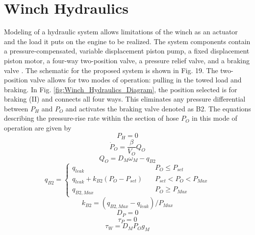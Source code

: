 \section{Winch Hydraulics}

Modeling of a hydraulic system allows limitations of the winch as an actuator and the load it puts on the engine to be realized. The system components contain a pressure-compensated, variable displacement piston pump, a fixed displacement piston motor, a four-way two-position valve, a pressure relief valve, and a braking valve \cite{MathWorks2015bb,MathWorks2015a,MathWorks2015PressureReliefValve}. The schematic for the proposed system is shown in Fig. 19. The two-position valve allows for two modes of operation: pulling in the towed load and braking. In Fig. \ref{fig:Winch_Hydraulics_Diagram}, the position selected is for braking (II) and connects all four ways. This eliminates any pressure differential between $P_H$ and $P_O$ and activates the braking valve denoted as B2. The equations describing the pressure-rise rate within the section of hose $P_O$ in this mode of operation are given by \cite{manring1998modeling}
\begin{equation}\label{eq:VP2_eq1}
    P_H = 0
\end{equation}
\begin{equation}\label{eq:VP2_eq2}
    \dot P_O = \frac{\beta}{V_O}Q_O
\end{equation}
\begin{equation}\label{eq:VP2_eq3}
    Q_O = D_M\omega_M - q_{B2}
\end{equation}
\begin{equation}\label{eq:VP2_eq4}
q_{B2} = \left\{
        \begin{array}{ll}
            q_{leak} & \quad P_O \leq P_{set} \\
            q_{leak} + k_{B2}(P_O - P_{set}) & \quad P_{set} < P_O < P_{Max} \\
            q_{B2,Max} & \quad P_O \geq P_{Max}
        \end{array}
    \right.
\end{equation}
\begin{equation}\label{eq:VP2_eq5}
    k_{B2} = (q_{B2,Max}-q_{leak})/P_{Max}
\end{equation}
\begin{equation}
    D_P = 0
\end{equation}
\begin{equation}
    \tau_{P} = 0
\end{equation}
\begin{equation}
    \tau_W = D_M P_O g_M
\end{equation}
